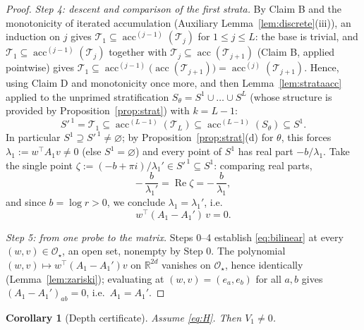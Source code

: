 \documentclass[11pt]{article}
\newtheorem{corollary}[theorem]{Corollary}
\theoremstyle{definition}
\theoremstyle{remark}
\theoremstyle{plain}
\newcommand{\R}{\mathbb{R}}
\newcommand{\cO}{\mathcal{O}}
\newcommand{\cT}{\mathcal{T}}
\newcommand{\acc}{\operatorname{acc}}
\begin{document}
\begin{proof}
\emph{Step 4: descent and comparison of the first strata.}  By Claim B and the
monotonicity of iterated accumulation (Auxiliary Lemma~\ref{lem:discrete}(iii)), an
induction on $j$ gives $\cT_1\subseteq\acc^{(j-1)}(\cT_j)$ for $1\le j\le L$: the base
is trivial, and $\cT_1\subseteq\acc^{(j-1)}(\cT_j)$ together with
$\cT_j\subseteq\acc(\cT_{j+1})$ (Claim B, applied pointwise) gives
$\cT_1\subseteq\acc^{(j-1)}\big(\acc(\cT_{j+1})\big)=\acc^{(j)}(\cT_{j+1})$.  Hence,
using Claim D and monotonicity once more, and then Lemma~\ref{lem:strataacc} applied to
the unprimed stratification $S_\theta=S^1\cup\dots\cup S^L$ (whose structure is provided
by Proposition~\ref{prop:strat}) with $k=L-1$:
\[
S'^{\,1}=\cT_1\subseteq\acc^{(L-1)}(\cT_L)\subseteq\acc^{(L-1)}(S_\theta)
\subseteq S^1 .
\]
In particular $S^1\supseteq S'^{\,1}\neq\varnothing$; by
Proposition~\ref{prop:strat}(d) for $\theta$, this forces
$\lambda_1:=w^\top A_1v\neq0$ (else $S^1=\varnothing$) and every point of $S^1$ has real
part $-b/\lambda_1$.  Take the single point
$\zeta:=(-b+\pi i)/\lambda_1'\in S'^{\,1}\subseteq S^1$: comparing real parts,
\[
-\,\frac{b}{\lambda_1'}=\operatorname{Re}\zeta=-\,\frac{b}{\lambda_1},
\]
and since $b=\log r>0$, we conclude $\lambda_1=\lambda_1'$, i.e.
\begin{equation}\label{eq:bilinear}
w^\top(A_1-A_1')\,v=0 .
\end{equation}

\emph{Step 5: from one probe to the matrix.}  Steps 0--4 establish
\eqref{eq:bilinear} at every $(w,v)\in\cO_\star$, an open set, nonempty by Step 0.  The
polynomial $(w,v)\mapsto w^\top(A_1-A_1')v$ on $\R^{2d}$ vanishes on $\cO_\star$, hence
identically (Lemma~\ref{lem:zariski}); evaluating at $(w,v)=(e_a,e_b)$ for all $a,b$
gives $(A_1-A_1')_{ab}=0$, i.e.\ $A_1=A_1'$.
\end{proof}

\begin{corollary}[Depth certificate]\label{cor:depth}
Assume \eqref{eq:H}.  Then $V_1\neq0$.
\end{corollary}
\end{document}
